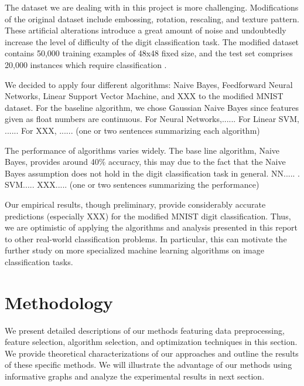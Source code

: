 \documentclass{acm_proc_article-sp}
\begin{document}
The dataset we are dealing with in this project is more challenging. Modifications of the original dataset include embossing, rotation, rescaling, and texture pattern. These artificial alterations introduce a great amount of noise and undoubtedly increase the  level of difficulty of the digit classification task. The modified dataset contains 50,000 training examples of 48x48 fixed size, and the test set comprises 20,000 instances which require classification \cite{comp598p3}.

We decided to apply four different algorithms: Naive Bayes, Feedforward Neural Networks, Linear Support Vector Machine, and XXX to the modified MNIST dataset. For the baseline algorithm, we chose Gaussian Naive Bayes since features given as float numbers are continuous.  For Neural Networks,......  For Linear SVM, ......  For XXX, ...... (one or two sentences summarizing each algorithm)

The performance of algorithms varies widely. The base line algorithm, Naive Bayes, provides around 40$\%$ accuracy, this may due to the fact that the Naive Bayes assumption does not hold in the digit classification task in general. NN..... . SVM..... XXX..... (one or two sentences summarizing the performance)

Our empirical results, though preliminary, provide considerably accurate predictions (especially XXX) for the modified MNIST digit classification. Thus, we are optimistic of applying the algorithms and analysis presented in this report to other real-world  classification problems. In particular, this can motivate the further study on more specialized machine learning algorithms on image classification tasks.










\section{Methodology}
We present detailed descriptions of our methods featuring data preprocessing, feature selection, algorithm selection, and optimization techniques in this section.  We provide theoretical characterizations of our approaches and outline the results of these specific methods. We will illustrate the advantage of our methods using informative graphs and analyze the experimental results in next section.
\end{document}
